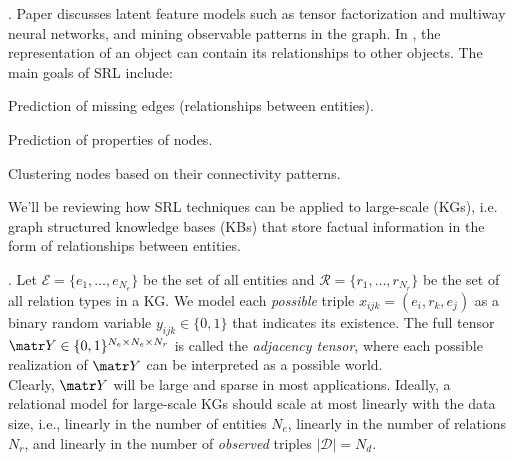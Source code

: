 \documentclass[11pt]{article}
\begin{document}
\p {}. Paper discusses latent feature models such as tensor factorization and multiway neural networks, and mining observable patterns in the graph. In , the representation of an object can contain its relationships to other objects. The main goals of SRL include:
\begin{compactitem}
	\item Prediction of missing edges (relationships between entities).
	\item Prediction of properties of nodes.
	\item Clustering nodes based on their connectivity patterns.
\end{compactitem}
We'll be reviewing how SRL techniques can be applied to large-scale  (KGs), i.e. graph structured knowledge bases (KBs) that store factual information in the form of relationships between entities.

\myspace
\p {}. Let $\mathcal{E} = \{e_1, \ldots, e_{N_e} \}$ be the set of all entities and $\mathcal R = \{r_1, \ldots, r_{N_r}\}$ be the set of all relation types in a KG. We model each \textit{possible} triple $x_{ijk} = (e_i, r_k, e_j)$ as a binary random variable $y_{ijk} \in \{0, 1\}$ that indicates its existence. The full tensor $\matr Y \in \{0, 1\}^{N_e \times N_e \times N_r}$ is called the \textit{adjacency tensor}, where each possible realization of $\matr Y$ can be interpreted as a possible world.\\

\p Clearly, $\matr Y$ will be large and sparse in most applications. Ideally, a relational model for large-scale KGs should scale at most linearly with the data size, i.e., linearly in the number of entities $N_e$, linearly in the number of relations $N_r$, and linearly in the number of \textit{observed} triples $|\mathcal D| = N_d$.
\end{document}
